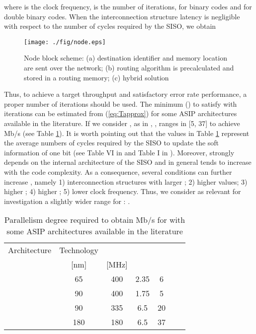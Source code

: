 \documentclass[10pt,twocolumn,journal]{IEEEtran}
\begin{document}
where  is the clock frequency,  is the number of iterations,  for binary codes and  for double 
binary codes. When the interconnection structure latency is negligible with respect to the number of cycles required 
by the SISO, we obtain

\begin{figure*}[th!]
  \centering
  \texttt{[image: ./fig/node.eps]}
\caption{Node block scheme: 
(a) destination identifier and memory location are sent over the network;
(b) routing algorithm is precalculated and stored in a routing memory;
(c) hybrid solution}
\label{fig:node}
\end{figure*}
Thus, to achieve a target throughput  and satisfactory error rate performance, a proper number  of 
iterations should be used. 
The minimum  () to satisfy  with  iterations can be estimated 
from (\ref{eq:Tapprox}) for some ASIP architectures available in the literature. 
If we consider , as in \cite{wehn_TVLSI08}, \cite{baghdadi_TVLSI09},
 ranges in [5, 37] to achieve  Mb/s (see Table \ref{tab:PASIP}).
It is worth pointing out that the  values in Table \ref{tab:PASIP} 
represent the average numbers of cycles required by the SISO to update the soft information of one bit 
(see Table VI in \cite{wehn_TVLSI08} and Table I in \cite{baghdadi_TVLSI09}).
Moreover,  strongly depends on the internal architecture of the SISO and in general tends to 
increase with the code complexity.
As a consequence, several conditions can further increase , namely 
1) interconnection structures with larger ; 2) higher  values; 
3) higher ; 
4) higher ; 
5) lower clock frequency.
Thus, we consider as relevant for investigation a slightly wider range for : .
\begin{table}[h!]
  \centering
\caption{Parallelism degree required to obtain  Mb/s for  with some ASIP architectures available in 
the literature}
  \label{tab:PASIP}
\begin{tabular}{|c|c|c|c|c|c|c|}
    \hline
Architecture       & Technology  &  &  &  \\
                        &  [nm]  & [MHz]     &        &       \\
    \hline 
\cite{wehn_TVLSI08}     & 65     & 400       & 2.35   & 6  \\
\cite{baghdadi_TVLSI09} & 90     & 400       & 1.75   & 5  \\
\cite{baghdadi_date06}  & 90     & 335       & 6.5    & 20 \\
\cite{baghdadi_date06}  & 180    & 180       & 6.5    & 37 \\
    \hline
  \end{tabular}
\end{table}
\end{document}
